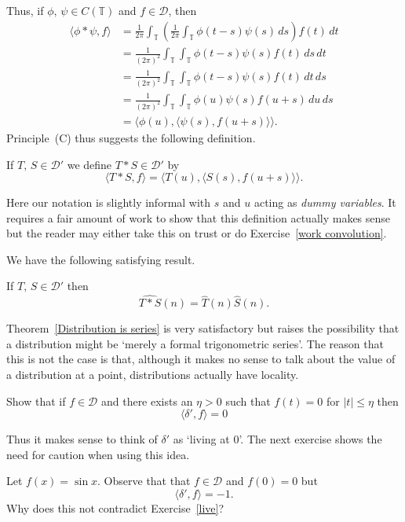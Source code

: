 Thus, if
$\phi,\,\psi\in C({\mathbb T})$ and $f\in{\mathcal D}$, then
\begin{align*}
\langle \phi*\psi,f\rangle
&=\frac{1}{2\pi}\int_{\mathbb T}
\left(\frac{1}{2\pi}\int_{\mathbb T}\phi(t-s)\psi(s)\,ds\right)
f(t)\,dt\\
&=\frac{1}{(2\pi)^{2}}\int_{\mathbb T}\int_{\mathbb T}
\phi(t-s)\psi(s)f(t)\,ds\,dt\\
&=\frac{1}{(2\pi)^{2}}\int_{\mathbb T}\int_{\mathbb T}
\phi(t-s)\psi(s)f(t)\,dt\,ds\\
&=\frac{1}{(2\pi)^{2}}\int_{\mathbb T}\int_{\mathbb T}
\phi(u)\psi(s)f(u+s)\,du\,ds\\
&=\langle \phi(u),\langle\psi(s),f(u+s)\rangle\rangle.
\end{align*}
Principle~(C) thus suggests the following definition.
\begin{definition} If $T,\,S\in{\mathcal D}'$
we define $T*S\in{\mathcal D}'$ by
\[ \langle T*S,f\rangle=\langle T(u),\langle S(s),f(u+s)\rangle\rangle.\]
\end{definition}
Here our notation is slightly informal with $s$ and $u$
acting as \emph{dummy variables}. It requires a fair amount
of work to show that this definition actually makes sense
but the reader may either take this on trust or do
Exercise~\ref{work convolution}.

We have the following satisfying result.
\begin{lemma} If $T,\,S\in{\mathcal D}'$ then
\[\widehat{T*S}(n)=\hat{T}(n)\hat{S}(n).\]
\end{lemma}

Theorem~\ref{Distribution is series} is very satisfactory
but raises the possibility that a distribution might
be `merely a formal trigonometric series'. The reason
that this is not the case is that, although it makes
no sense to talk about the value of a distribution at a
point, distributions actually have locality.
\begin{exercise}\label{live}
Show that if $f\in{\mathcal D}$ and there
exists an $\eta>0$ such that $f(t)=0$ for $|t|\leq \eta$
then
\[\langle \delta',f\rangle=0\]
\end{exercise}
Thus it makes sense to think of $\delta'$ as `living at $0$'.
The next exercise shows the need for caution when using this idea.
\begin{exercise} Let $f(x)=\sin x$. Observe that that $f\in{\mathcal D}$
and $f(0)=0$ but
\[\langle \delta',f\rangle=-1.\]
Why does this not contradict Exercise~\ref{live}?
\end{exercise}

